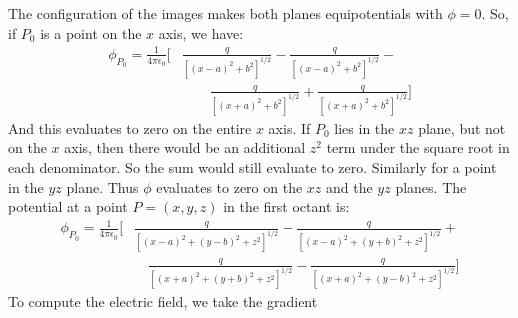                 \begin{solution}
                    The configuration of the images makes both planes
                    equipotentials with $\phi=0$. So, if
                    $P_{0}$ is a point on the $x$ axis, we have:
                    \begin{equation}
                        \begin{split}
                            \phi_{P_{0}}=
                            \frac{1}{4\pi\epsilon_{0}}\Big[
                                &
                                \frac{q}{[(x-a)^{2}+b^{2}]^{1/2}}-
                                \frac{q}{[(x-a)^{2}+b^{2}]^{1/2}}-\\
                                &
                                \quad\quad
                                \frac{q}{[(x+a)^{2}+b^{2}]^{1/2}}+
                                \frac{q}{[(x+a)^{2}+b^{2}]^{1/2}}\Big]
                        \end{split}
                    \end{equation}
                    And this evaluates to zero on the entire $x$ axis.
                    If $P_{0}$ lies in the $xz$ plane, but not on the
                    $x$ axis, then there would be an additional $z^{2}$
                    term under the square root in each denominator. So
                    the sum would still evaluate to zero. Similarly for
                    a point in the $yz$ plane. Thus $\phi$ evaluates to
                    zero on the $xz$ and the $yz$ planes. The potential
                    at a point $P=(x,y,z)$ in the first octant is:
                    \begin{equation}
                        \begin{split}
                            \phi_{P_{0}}=
                            \frac{1}{4\pi\epsilon_{0}}\Big[
                            &
                            \frac{q}{[(x-a)^{2}+(y-b)^{2}+z^{2}]^{1/2}}-
                            \frac{q}{[(x-a)^{2}+(y+b)^{2}+z^{2}]^{1/2}}+
                            \\
                            &\quad
                            \frac{q}{[(x+a)^{2}+(y+b)^{2}+z^{2}]^{1/2}}-
                            \frac{q}{[(x+a)^{2}+(y-b)^{2}+z^{2}]^{1/2}}
                            \Big]
                        \end{split}
                    \end{equation}
                    To compute the electric field, we take the gradient

\end{solution}
